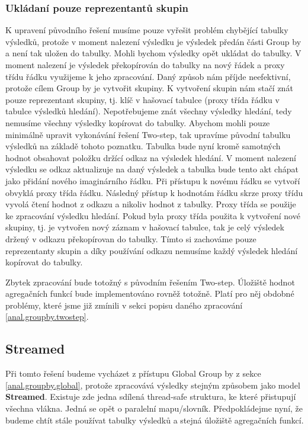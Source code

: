 \subsubsection{Ukládaní pouze reprezentantů skupin}

K upravení původního řešení musíme pouze vyřešit problém chybějící tabulky výsledků, protože v moment nalezení výsledku je výsledek předán části Group by a není tak uložen do tabulky.
Mohli bychom výsledky opět ukládat do tabulky.
V moment nalezení je výsledek překopírován do tabulky na nový řádek a proxy třídu řádku využijeme k jeho zpracování.
Daný způsob nám příjde neefektivní, protože cílem Group by je vytvořit skupiny. 
K vytvoření skupin nám stačí znát pouze reprezentant skupiny, tj. klíč v hašovací tabulce (proxy třída řádku v tabulce výsledků hledání).
Nepotřebujeme znát všechny výsledky hledání, tedy nemusíme všechny výsledky kopírovat do tabulky.
Abychom mohli pouze minimálně upravit vykonávání řešení Two-step, tak upravíme původní tabulku výsledků na základě tohoto poznatku.
Tabulka bude nyní kromě samotných hodnot obsahovat položku držící odkaz na výsledek hledání.
V moment nalezení výsledku se odkaz aktualizuje na daný výsledek a tabulka bude tento akt chápat jako přidání nového imaginárního řádku.
Při přístupu k novému řádku se vytvoří obvyklá proxy třída řádku.
Následný přístup k hodnotám řádku skrze proxy třídu vyvolá čtení hodnot z odkazu a nikoliv hodnot z tabulky.
Proxy třída se použije ke zpracování výsledku hledání.
Pokud byla proxy třída použita k vytvoření nové skupiny, tj. je vytvořen nový záznam v hašovací tabulce, tak je celý výsledek držený v odkazu překopírovan do tabulky.
Tímto si zachováme pouze reprezentanty skupin a díky používání odkazu nemusíme každý výsledek hledání kopírovat do tabulky.

\smallskip
Zbytek zpracování bude totožný s původním řešením Two-step.
Úložiště hodnot agregačních funkcí bude implementováno rovněž totožně.
Platí pro něj obdobné problémy, které jsme již zmínili v sekci popisu daného zpracování \ref{anal.groupby.twostep}. 


\subsection{Streamed}

Při tomto řešení budeme vycházet z přístupu Global Group by z sekce \ref{anal.groupby.global}, protože zpracovává výsledky stejným způsobem jako model \textbf{Streamed}.
Existuje zde jedna sdílená thread-safe struktura, ke které přistupují všechna vlákna.
Jedná se opět o paralelní mapu/slovník.
Předpokládejme nyní, že budeme chtít stále používat tabulky výsledků a stejná úložiště agregačních funkcí.

